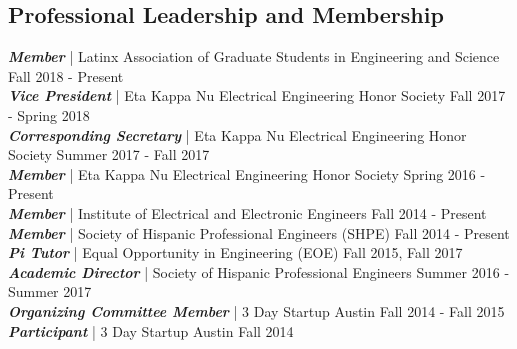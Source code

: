 \documentclass[letter]{res}
\begin{document}
\begin{resume}
\vspace{-6mm}

\section{Professional Leadership and Membership}
{\sl \textbf{Member}} | Latinx Association of Graduate Students in Engineering and Science \hfill Fall 2018 - Present\\
{\sl \textbf{Vice President}} | Eta Kappa Nu Electrical Engineering Honor Society \hfill Fall 2017 - Spring 2018\\
{\sl \textbf{Corresponding Secretary}} | Eta Kappa Nu Electrical Engineering Honor Society \hfill Summer 2017 - Fall 2017\\
{\sl \textbf{Member}} | Eta Kappa Nu Electrical Engineering Honor Society \hfill Spring 2016 - Present\\
{\sl \textbf{Member}} | Institute of Electrical and Electronic Engineers \hfill Fall 2014 - Present\\
{\sl \textbf{Member}} | Society of Hispanic Professional Engineers (SHPE) \hfill Fall 2014 - Present\\
{\sl \textbf{Pi Tutor}} | Equal Opportunity in Engineering (EOE) \hfill Fall 2015, Fall 2017\\
{\sl \textbf{Academic Director}} | Society of Hispanic Professional Engineers \hfill Summer 2016 - Summer 2017\\
{\sl \textbf{Organizing Committee Member}} | 3 Day Startup Austin \hfill Fall 2014 - Fall 2015\\
{\sl \textbf{Participant}} | 3 Day Startup Austin \hfill Fall 2014\\

\vspace{-6mm}


\end{resume}
\end{document}
